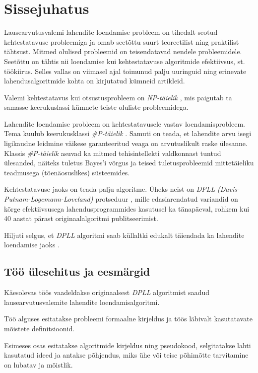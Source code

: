 \chapter*{Sissejuhatus}

Lausearvutusvalemi lahendite loendamise probleem on tihedalt seotud
kehtestatavuse probleemiga ja omab seetõttu suurt teoreetilist ning
praktilist tähtsust. Mitmed olulised probleemid on teisendatavad
nendele probleemidele. Seetõttu on tähtis nii loendamise kui kehtestatavuse
algoritmide efektiivsus, st. töökiirus. Selles vallas on viimasel ajal
toimunud palju uuringuid ning erinevate lahendusalgoritmide kohta on kirjutatud
kümneid artikleid.

Valemi kehtestatavus kui otsustusprobleem on \textit{NP-täielik} \cite{cook71},
mis paigutab ta samasse keerukuslassi kümnete teiste oluliste probleemidega.

Lahendite loendamise probleem on kehtestatavusele vastav loendamisprobleem.
Tema kuulub keerukusklassi \textit{\#P-täielik} \cite{roth96}. Samuti on
teada, et lahendite arvu isegi ligikaudne leidmine väikese garanteeritud veaga
on arvutuslikult raske ülesanne. Klassis \textit{\#P-täielik} asuvad ka mitmed
tehisintellekti valdkonnast tuntud ülesanded, näiteks tuletus Bayes'i võrgus ja
teised tuletusprobleemid mittetäieliku teadmusega (tõenäosuslikes)
süsteemides.

Kehtestatavuse jaoks on teada palju algoritme. Üheks neist on \textit{DPLL}
\emph{(Davis-Putnam-Logemann-Loveland)} protseduur \cite{davis60,davis62},
mille edasiarendatud variandid on kõrge efektiivsusega lahendusprogrammides
kasutusel ka tänapäeval, rohkem kui 40 aastat pärast originaalalgoritmi
publitseerimist.

Hiljuti selgus, et \textit{DPLL} algoritmi saab küllaltki edukalt täiendada ka
lahendite loendamise jaoks \cite{birnbaum99}.

\section*{Töö ülesehitus ja eesmärgid}

Käesolevas töös vaadeldakse originaalsest \textit{DPLL} algoritmist
saadud lausearvutusvalemite lahendite loendamisalgoritmi.

Töö alguses esitatakse probleemi formaalne kirjeldus ja töös
läbivalt kasutatavate mõistete definitsioonid.

Esimeses osas esitatakse algoritmide kirjeldus ning pseudokood,
selgitatakse lahti kasutatud ideed ja antakse
põhjendus, miks ühe või teise põhimõtte tarvitamine on lubatav ja mõistlik.

